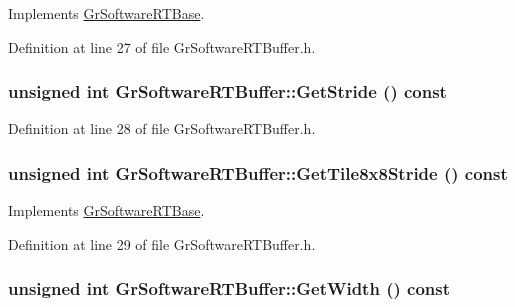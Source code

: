 Implements \hyperlink{class_gr_software_r_t_base_28d12d92fea7b0a5891123fe7d5dfc74}{GrSoftwareRTBase}.

Definition at line 27 of file GrSoftwareRTBuffer.h.\hypertarget{class_gr_software_r_t_buffer_4b44fe3409b607a037b567ec19830257}{
\subsubsection[{GetStride}]{\setlength{\rightskip}{0pt plus 5cm}unsigned int GrSoftwareRTBuffer::GetStride () const}}
\label{class_gr_software_r_t_buffer_4b44fe3409b607a037b567ec19830257}




Definition at line 28 of file GrSoftwareRTBuffer.h.\hypertarget{class_gr_software_r_t_buffer_c0be8c165c3d4a9f110880704f6b2c42}{
\subsubsection[{GetTile8x8Stride}]{\setlength{\rightskip}{0pt plus 5cm}unsigned int GrSoftwareRTBuffer::GetTile8x8Stride () const}}
\label{class_gr_software_r_t_buffer_c0be8c165c3d4a9f110880704f6b2c42}




Implements \hyperlink{class_gr_software_r_t_base_9ed681a9c06bd9657f75e7590bfee5ac}{GrSoftwareRTBase}.

Definition at line 29 of file GrSoftwareRTBuffer.h.\hypertarget{class_gr_software_r_t_buffer_c61ed73f4c054a6b3b6cf98e37741f87}{
\subsubsection[{GetWidth}]{\setlength{\rightskip}{0pt plus 5cm}unsigned int GrSoftwareRTBuffer::GetWidth () const}}
\label{class_gr_software_r_t_buffer_c61ed73f4c054a6b3b6cf98e37741f87}




